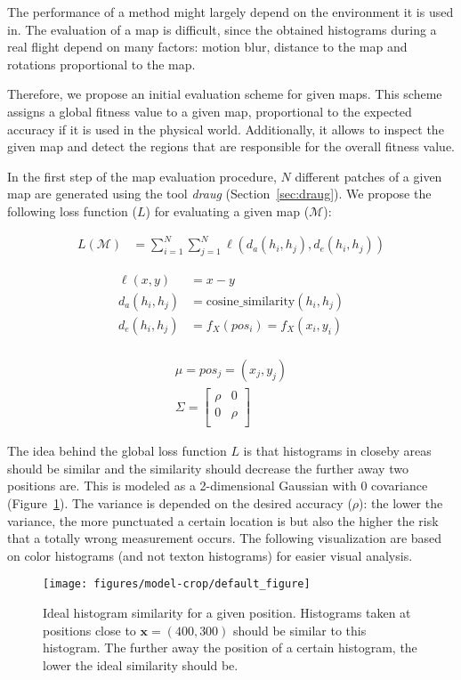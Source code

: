 The performance of a method might largely depend
on the environment it is used in. The evaluation of a map is
difficult, since the obtained histograms during a real flight depend
on many factors: motion blur, distance to the map and rotations
proportional to the map.

Therefore, we propose an initial evaluation scheme for given
maps. This scheme assigns a global fitness value to a given map,
proportional to the expected accuracy if it is used in the physical
world. Additionally, it allows to inspect the given map and detect the
regions that are responsible for the overall fitness value.

In the first step of the map evaluation procedure, $N$ different
patches of a given map are generated using the tool \emph{draug}
(Section~\ref{sec:draug}). We propose the following loss function
($L$) for evaluating a given map ($\mathcal{M}$):

\begin{align}
  L(\mathcal{M}) &= \sum_{i = 1}^{N} \sum_{j = 1}^{N} \ell(d_a(h_i, h_j), d_e(h_i, h_j))
\end{align}

\begin{align}
  \ell(x, y) &= x - y\\
  d_a(h_i, h_j) &= \text{cosine\_similarity}(h_i, h_j)\\
  d_e(h_i, h_j) &= f_X(pos_i) = f_X(x_i, y_i)\\
\end{align}

\begin{align}
\mu = pos_j = (x_j, y_j)\\
\Sigma =
  \begin{bmatrix}
    \rho & 0\\
    0 & \rho\\
  \end{bmatrix}
\end{align}

The idea behind the global loss function $L$ is that histograms in closeby areas
should be similar and the similarity should decrease the further away
two positions are. This is modeled as a 2-dimensional Gaussian with 0
covariance (Figure~\ref{fig:model}). The variance is depended on the
desired accuracy ($\rho$): the lower the variance, the more punctuated
a certain location is but also the higher the risk that a totally
wrong measurement occurs. The following visualization are based on
color histograms (and not texton histograms) for easier visual
analysis.

\begin{figure}[h!]
\begin{center}
\texttt{[image: figures/model-crop/default\_figure]}
\caption{{\label{fig:model} Ideal
    histogram similarity for a given position. Histograms taken at
    positions close to $\textbf{x} = (400, 300)$ should be similar to
    this histogram. The further away the position of a certain
    histogram, the lower the ideal similarity should be.%
}}
\end{center}
\end{figure}